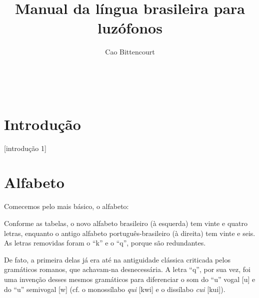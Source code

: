 \documentclass[12pt, a5paper, titlepage]{article}
\title{Manual da língua brasileira para luzófonos}
\author{Cao Bittencourt}
\date{}
\begin{document}
\maketitle
\thispagestyle{empty}

\newpage \
\thispagestyle{empty}

\newpage
\tableofcontents
\newpage

\section{Introdução}
[introdução 1]
\newpage
[introdução 2]

\newpage
\section{Alfabeto}\label{pt.section.abc}
Comecemos pelo mais básico, o alfabeto:

\PtTableAbc
Conforme as tabelas, o novo alfabeto brasileiro (à esquerda) tem vinte e quatro letras, enquanto o antigo alfabeto português-brasileiro (à direita) tem vinte e seis. As letras removidas foram o ``k'' e o ``q'', porque são redundantes. 

De fato, a primeira delas já era até na antiguidade clássica criticada pelos gramáticos romanos, que achavam-na desnecessária. A letra ``q'', por sua vez, foi uma invenção desses mesmos gramáticos para diferenciar o som do ``u'' vogal [u] e do ``u'' semivogal [w] (cf. o monossílabo \textit{qui} [kwi] e o dissílabo \textit{cui} [ku\textprimstress i]).
\end{document}

